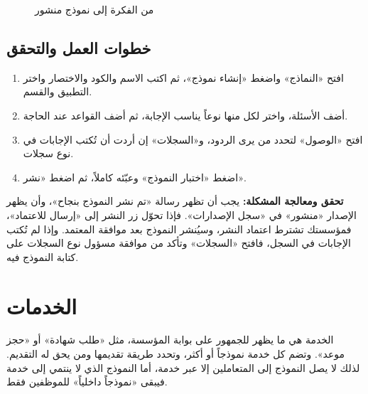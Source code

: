 \begin{figure}[H]
\centering
{}
\rclegend
\caption{من الفكرة إلى نموذج منشور}
\label{fig:builder-forms-flow}
\end{figure}

\subsection{خطوات العمل والتحقق}
\begin{enumerate}
\item افتح «النماذج» واضغط «إنشاء نموذج»، ثم اكتب الاسم والكود والاختصار واختر التطبيق والقسم.
\item أضف الأسئلة، واختر لكل منها نوعاً يناسب الإجابة، ثم أضف القواعد عند الحاجة.
\item افتح «الوصول» لتحدد من يرى الردود، و«السجلات» إن أردت أن تُكتب الإجابات في نوع سجلات.
\item اضغط «اختبار النموذج» وعبّئه كاملاً، ثم اضغط «نشر».
\end{enumerate}

\textbf{تحقق ومعالجة المشكلة:} يجب أن تظهر رسالة «تم نشر النموذج بنجاح»، وأن يظهر الإصدار «منشور» في «سجل الإصدارات». فإذا تحوّل زر النشر إلى «إرسال للاعتماد»، فمؤسستك تشترط اعتماد النشر، وسيُنشر النموذج بعد موافقة المعتمد. وإذا لم تُكتب الإجابات في السجل، فافتح «السجلات» وتأكد من موافقة مسؤول نوع السجلات على كتابة النموذج فيه.

\clearpage
\section{الخدمات}
\label{sec:builder-feature-services}

الخدمة هي ما يظهر للجمهور على بوابة المؤسسة، مثل «طلب شهادة» أو «حجز موعد». وتضم كل خدمة نموذجاً أو أكثر، وتحدد طريقة تقديمها ومن يحق له التقديم. لذلك لا يصل النموذج إلى المتعاملين إلا عبر خدمة، أما النموذج الذي لا ينتمي إلى خدمة فيبقى «نموذجاً داخلياً» للموظفين فقط.

